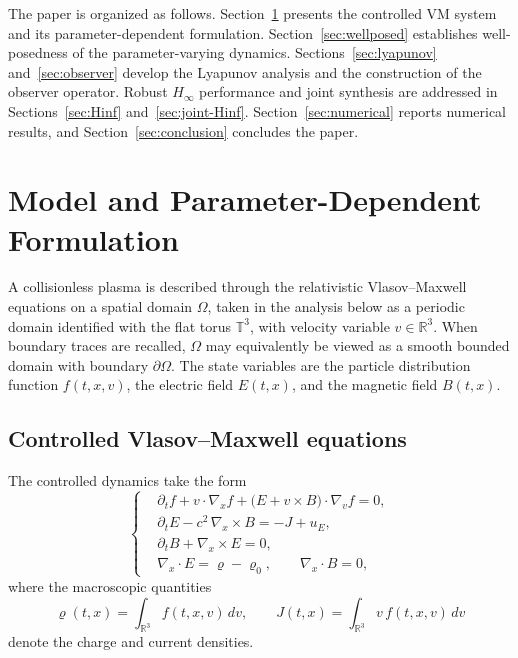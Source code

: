 \documentclass[AMA,Times2COL]{WileyNJDv5}
\begin{document}
The paper is organized as follows.
Section~\ref{sec:model} presents the controlled VM system and its parameter-dependent formulation.
Section~\ref{sec:wellposed} establishes well-posedness of the parameter-varying dynamics.
Sections~\ref{sec:lyapunov} and~\ref{sec:observer} develop the Lyapunov analysis and the construction of the observer operator. Robust $H_\infty$ performance and joint synthesis are addressed in Sections~\ref{sec:Hinf} and~\ref{sec:joint-Hinf}. Section~\ref{sec:numerical} reports numerical results, and Section~\ref{sec:conclusion} concludes the paper.


\section{Model and Parameter-Dependent Formulation}
\label{sec:model}

A collisionless plasma is described through the relativistic Vlasov--Maxwell equations on a spatial domain $\Omega$, taken in the analysis below as a periodic domain identified with the flat torus $\mathbb T^3$, with velocity variable $v\in\mathbb{R}^3$.
When boundary traces are recalled, $\Omega$ may equivalently be viewed as a smooth bounded domain with boundary $\partial\Omega$.
The state variables are the particle distribution function $f(t,x,v)$, the electric field $E(t,x)$, and the magnetic field $B(t,x)$.

\subsection{Controlled Vlasov--Maxwell equations}

The controlled dynamics take the form
\begin{equation}\label{eq:VM-control}
\left\{
\begin{aligned}
&\partial_t f + v\!\cdot\nabla_x f 
  + \big(E + v\times B\big)\!\cdot\nabla_v f = 0,\\[0.4em]
&\partial_t E - c^2\,\nabla_x\times B = - J + u_E,\\[0.4em]
&\partial_t B + \nabla_x\times E = 0,\\[0.4em]
&\nabla_x\!\cdot E = \varrho - \varrho_0,\qquad 
 \nabla_x\!\cdot B = 0,
\end{aligned}
\right.
\end{equation}
where the macroscopic quantities
\[
\varrho(t,x)= \int_{\mathbb{R}^3} f(t,x,v)\,dv,
\qquad
J(t,x)= \int_{\mathbb{R}^3} v\, f(t,x,v)\,dv
\]
denote the charge and current densities.
\end{document}
